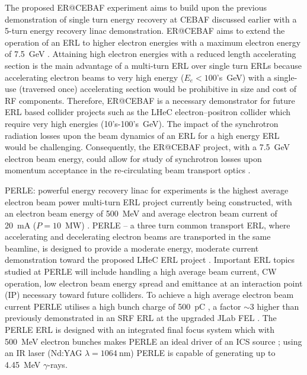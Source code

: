 \documentclass[../main.tex]{subfiles}
\begin{document}
The proposed ER@CEBAF experiment aims to build upon the previous demonstration of single turn energy recovery at CEBAF \cite{bogacz2003cebaf} discussed earlier with a 5-turn energy recovery linac demonstration. ER@CEBAF aims to extend the operation of an ERL to higher electron energies with a maximum electron energy of 7.5~\si{\giga\electronvolt} \cite{bogacz2016er,meot2016er}. Attaining high electron energies with a reduced length accelerating section is the main advantage of a multi-turn ERL over single turn ERLs because accelerating electron beams to very high energy ($E_{e} < 100$'s~\si{\giga\electronvolt}) with a single-use (traversed once) accelerating section would be prohibitive in size and cost of RF components. Therefore, ER@CEBAF is a necessary demonstrator for future ERL based collider projects such as the LHeC electron--positron collider \cite{valloni2013strawman,bruning2019exploring,holzer2021accelerator} which require very high energies (10's-100's~\si{\giga\electronvolt}). The impact of the synchrotron radiation losses upon the beam dynamics of an ERL for a high energy ERL would be challenging. Consequently, the ER@CEBAF project, with a 7.5~\si{\giga\electronvolt} electron beam energy, could allow for study of synchrotron losses upon momentum acceptance in the re-circulating beam transport optics \cite{adolphsen2022european}.  

PERLE: powerful energy recovery linac for experiments is the highest average electron beam power multi-turn ERL project currently being constructed, with an electron beam energy of 500~\si{\mega\electronvolt} and average electron beam current of 20~\si{\milli\ampere} ($P = 10$~\si{\mega\watt}) \cite{angal2018perle,bogacz2021perle}. PERLE -- a three turn common transport ERL, where accelerating and decelerating electron beams are transported in the same beamline, is designed to provide a moderate energy, moderate current demonstration toward the proposed LHeC ERL project \cite{valloni2013strawman,bruning2019exploring,holzer2021accelerator}. Important ERL topics studied at PERLE will include handling a high average beam current, CW operation, low electron beam energy spread and emittance at an interaction point (IP) \cite{adolphsen2022european} necessary toward future colliders. To achieve a high average electron beam current PERLE utilises a high bunch charge of 500~\si{\pico\coulomb} \cite{hounsell2021optimization}, a factor $\sim3$ higher than previously demonstrated in an SRF ERL at the upgraded JLab FEL \cite{neil2006jlab}. The PERLE ERL is designed with an integrated final focus system which with 500~\si{\mega\electronvolt} electron bunches makes PERLE an ideal driver of an ICS source \cite{adolphsen2022european}; using an IR laser (Nd:YAG $\lambda=1064~\si{\nano\meter}$) PERLE is capable of generating up to 4.45~\si{\mega\electronvolt} $\gamma$-rays.      
\end{document}
